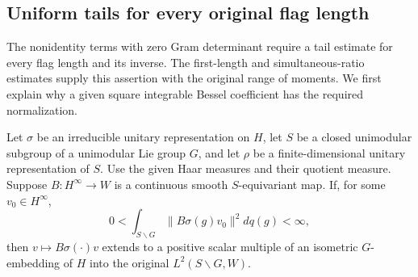 \subsection{Uniform tails for every original flag length}
\label{global-gram-continuation-length-tail}

The nonidentity terms with zero Gram determinant require a tail
estimate for every flag length and its inverse.  The first-length
and simultaneous-ratio estimates supply this assertion with the
original range of moments.  We first explain why a given square
integrable Bessel coefficient has the required normalization.

\begin{lemma}\label{global-gram-finite-bessel-realization}
Let $\sigma$ be an irreducible unitary representation on $H$, let
$S$ be a closed unimodular subgroup of a unimodular Lie group $G$,
and let $\rho$ be a finite-dimensional unitary representation of $S$.
Use the given Haar measures and their quotient measure.  Suppose
$B:H^\infty\to W$ is a continuous smooth $S$-equivariant map.
If, for some $v_0\in H^\infty$,
\[
       0<\int_{S\backslash G}\|B\sigma(g)v_0\|^2dq(g)<\infty,
\]
then $v\mapsto B\sigma(\cdot)v$ extends to a positive scalar
multiple of an isometric $G$-embedding of $H$ into the original
$L^2(S\backslash G,W)$.
\end{lemma}
